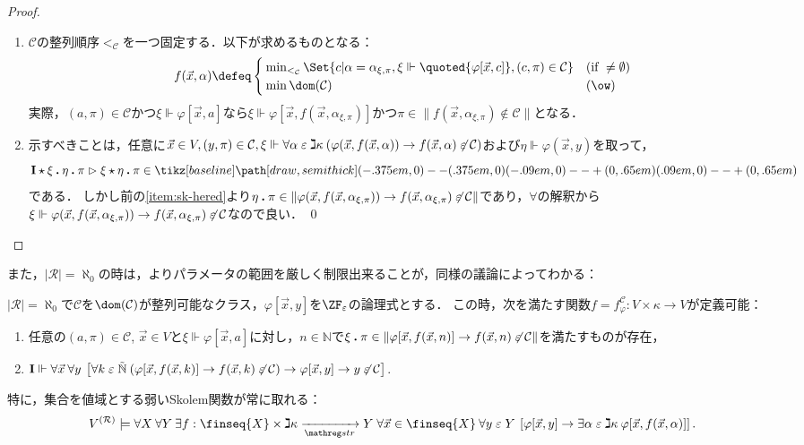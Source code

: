 \documentclass[realisability.tex]{subfiles}
\begin{document}
\begin{proof}
 \begin{enumerate}
  \item $\mathcal{C}$の整列順序${<_{\mathcal{C}}}$を一つ固定する．以下が求めるものとなる：
        \[
         f(\vec{x}, \alpha) \defeq
         \begin{cases}
          \min_{<_{\mathcal{C}}} \Set{c | \alpha = \alpha_{\xi, \pi}, \xi \Vdash \quoted{\varphi[\vec{x}, c]}, (c, \pi) \in \mathcal{C}} & (\text{if } \neq \emptyset)\\
          \min \dom(\mathcal{C}) & (\ow)
         \end{cases}
        \]
        実際，$(a, \pi) \in \mathcal{C}$かつ$\xi \Vdash \varphi[\vec{x}, a]$なら$\xi \Vdash \varphi[\vec{x}, f(\vec{x}, \alpha_{\xi,\pi})]$かつ$\pi \in \|f(\vec{x}, \alpha_{\xi,\pi}) \notin \mathcal{C}\|$となる．
  \item 示すべきことは，任意に$\vec{x} \in V, (y, \pi) \in \mathcal{C}, \xi \Vdash \forall \alpha \mathrel{\varepsilon} \gimel \kappa \:(\varphi(\vec{x}, f(\vec{x}, \alpha)) \to f(\vec{x}, \alpha) \not\mathrel{\varepsilon} \mathcal{C})$および$\eta \Vdash \varphi(\vec{x}, y)$を取って，
        \[
         \KVM{{\I}{\xi}{\eta}{\pi}} \redsto \KVM{{\xi}{\eta}{\pi}} \in \pole
        \]
        である．
        しかし前の\ref{item:sk-hered}より$\eta \mathbin{\boldsymbol{.}} \pi \in \|\varphi(\vec{x}, f(\vec{x}, \alpha_{\xi,\pi})) \to f(\vec{x}, \alpha_{\xi,\pi}) \not\mathrel{\varepsilon} \mathcal{C}\|$であり，$\forall$の解釈から$\xi \Vdash \varphi(\vec{x}, f(\vec{x}, \alpha_{\xi,\pi})) \to f(\vec{x}, \alpha_{\xi,\pi}) \not\mathrel{\varepsilon} \mathcal{C}$なので良い． \qed
 \end{enumerate}
\end{proof}
また，$|\mathcal{R}| = \aleph_0$の時は，よりパラメータの範囲を厳しく制限出来ることが，同様の議論によってわかる：
\begin{lemma}\label{lem:weak-skolem-ctbl}
 $|\mathcal{R}| = \aleph_0$で$\mathcal{C}$を$\dom(\mathcal{C})$が整列可能なクラス，$\varphi[\vec{x}, y]$を$\ZF_{\varepsilon}$の論理式とする．
 この時，次を満たす関数$f = f^{\mathcal{C}}_{\varphi}: V \times \kappa \to V$が定義可能：
 \begin{enumerate}
  \item \label{item:sk-hered}任意の$(a, \pi) \in \mathcal{C}$, $\vec{x} \in V$と$\xi \Vdash \varphi[\vec{x}, a]$に対し，$n \in \mathbb{N}$で$\xi \mathbin{\boldsymbol{.}} \pi \in \|\varphi[\vec{x}, f(\vec{x}, n)] \to f(\vec{x}, n) \not\mathrel{\varepsilon} \mathcal{C}\|$を満たすものが存在，
  \item $\mathsf{\mathbf{I}} \Vdash \forall \vec{x} \: \forall y \:\left[ \forall k \mathrel{\varepsilon} \mathord{\tilde{\mathbb{N}}}\: (\varphi[\vec{x}, f(\vec{x}, k)] \to f(\vec{x},k) \not\mathrel{\varepsilon} \mathcal{C}) \to \varphi[\vec{x}, y] \to y \not\mathrel{\varepsilon} \mathcal{C} \right]$. 
 \end{enumerate}
 特に，集合を値域とする弱いSkolem関数が常に取れる：
 \[
 V^{(\mathcal{R})} \models \forall X\: \forall Y \: \exists f: \finseq{X} \times \gimel \kappa \strto Y\; \forall \vec{x} \in \finseq{X} \:\forall y \strin Y \: 
  \left[\varphi[\vec{x}, y] \to \exists \alpha \strin \gimel \kappa \: \varphi[\vec{x}, f(\vec{x}, \alpha)]\right].
 \]
\end{lemma}
\end{document}
